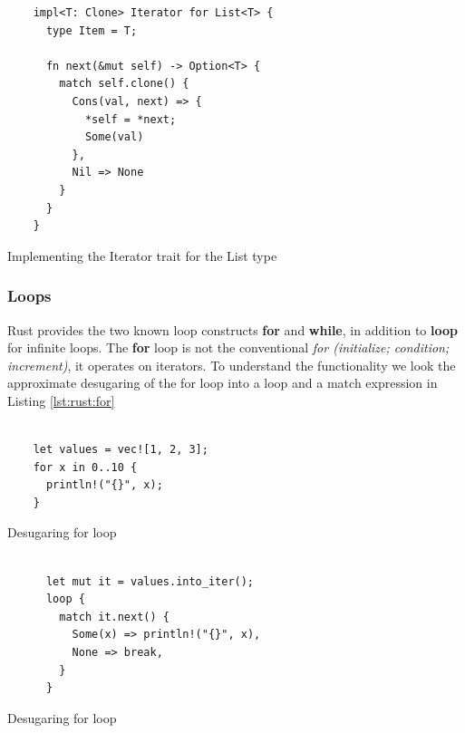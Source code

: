 \begin{listing}[H]
  \begin{verbatim}
    impl<T: Clone> Iterator for List<T> {
      type Item = T;

      fn next(&mut self) -> Option<T> {
        match self.clone() {
          Cons(val, next) => {
            *self = *next;
            Some(val)
          },
          Nil => None
        }
      }
    }
  \end{verbatim}
  \caption{Implementing the Iterator trait for the List type}
  \label{lst:rust:list-iter}
\end{listing}


\subsubsection{Loops}

Rust provides the two known loop constructs \textbf{for} and \textbf{while}, in addition to \textbf{loop} for infinite loops.
The \textbf{for} loop is not the conventional \textit{for (initialize; condition; increment)}, it operates on iterators.
To understand the functionality we look the approximate desugaring of the for loop into a loop and a match expression in Listing \ref{lst:rust:for}


\begin{minipage}[b]{0.5\linewidth}
  \begin{listing}[H]
  \begin{verbatim}

    let values = vec![1, 2, 3];
    for x in 0..10 {
      println!("{}", x);
    }

  \end{verbatim}
  \caption{Desugaring for loop}
  \label{lst:rust:for}
  \end{listing}
  \end{minipage}

\begin{minipage}[b]{0.5\linewidth}
  \begin{listing}[H]
    \begin{verbatim}

      let mut it = values.into_iter();
      loop {
        match it.next() {
          Some(x) => println!("{}", x),
          None => break,
        }
      }

    \end{verbatim}

    \caption{Desugaring for loop}
    \label{lst:rust:desugared-for}
  \end{listing}
\end{minipage}


